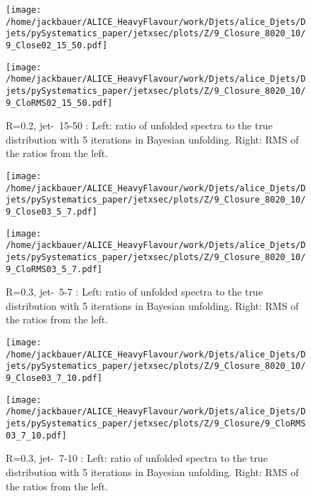 \begin{figure}
\centering
\begin{minipage}{.5\textwidth}
  \centering
  \texttt{[image: /home/jackbauer/ALICE\_HeavyFlavour/work/Djets/alice\_Djets/Djets/pySystematics\_paper/jetxsec/plots/Z/9\_Closure\_8020\_10/9\_Close02\_15\_50.pdf]}
\end{minipage}%
\begin{minipage}{.5\textwidth}
  \centering
  \texttt{[image: /home/jackbauer/ALICE\_HeavyFlavour/work/Djets/alice\_Djets/Djets/pySystematics\_paper/jetxsec/plots/Z/9\_Closure\_8020\_10/9\_CloRMS02\_15\_50.pdf]}
\end{minipage}
  \caption{R=0.2, jet-\pt\ 15-50 \GeVc: Left: ratio of unfolded spectra to the true distribution with 5 iterations in Bayesian unfolding. Right: RMS of the ratios from the left.}
  \label{fig:UnfClosZchR02_15_50}
\end{figure}
\begin{figure}
\centering
\begin{minipage}{.5\textwidth}
  \centering
  \texttt{[image: /home/jackbauer/ALICE\_HeavyFlavour/work/Djets/alice\_Djets/Djets/pySystematics\_paper/jetxsec/plots/Z/9\_Closure\_8020\_10/9\_Close03\_5\_7.pdf]}
\end{minipage}%
\begin{minipage}{.5\textwidth}
  \centering
  \texttt{[image: /home/jackbauer/ALICE\_HeavyFlavour/work/Djets/alice\_Djets/Djets/pySystematics\_paper/jetxsec/plots/Z/9\_Closure\_8020\_10/9\_CloRMS03\_5\_7.pdf]}
\end{minipage}
  \caption{R=0.3, jet-\pt\ 5-7 \GeVc: Left: ratio of unfolded spectra to the true distribution with 5 iterations in Bayesian unfolding. Right: RMS of the ratios from the left.}
  \label{fig:UnfClosZchR03_5_7}
\end{figure}
\begin{figure}
\centering
\begin{minipage}{.5\textwidth}
  \centering
  \texttt{[image: /home/jackbauer/ALICE\_HeavyFlavour/work/Djets/alice\_Djets/Djets/pySystematics\_paper/jetxsec/plots/Z/9\_Closure\_8020\_10/9\_Close03\_7\_10.pdf]}
\end{minipage}%
\begin{minipage}{.5\textwidth}
  \centering
  \texttt{[image: /home/jackbauer/ALICE\_HeavyFlavour/work/Djets/alice\_Djets/Djets/pySystematics\_paper/jetxsec/plots/Z/9\_Closure/9\_CloRMS03\_7\_10.pdf]}
\end{minipage}
  \caption{R=0.3, jet-\pt\ 7-10 \GeVc: Left: ratio of unfolded spectra to the true distribution with 5 iterations in Bayesian unfolding. Right: RMS of the ratios from the left.}
  \label{fig:UnfClosZchR03_7_10}
\end{figure}
